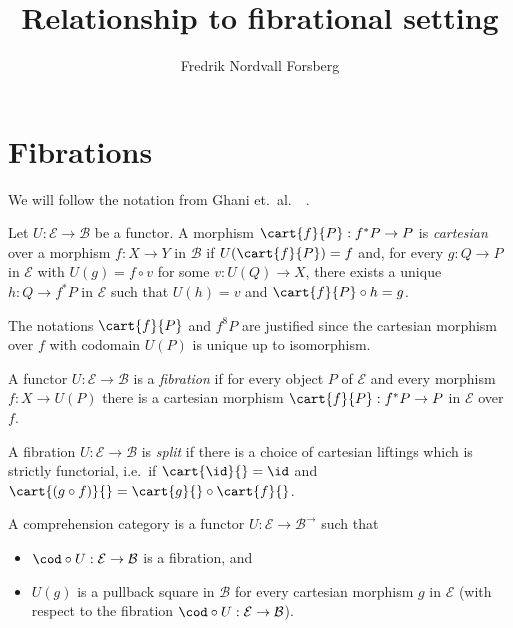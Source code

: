 \documentclass{article}
\title{Relationship to fibrational setting}
\author{Fredrik Nordvall Forsberg}
\begin{document}
\maketitle

\section{Fibrations}

We will follow the notation from Ghani et.\
al.\ ~\cite{ghaniJohannFumex2010fibind,ghaniJohannFumex2011indexedInd}.

\begin{definition}
  Let $U : \mathcal{E} \to \mathcal{B}$ be a functor. A morphism
  $\cart{f}{P} : f^* P \to P$ is \emph{cartesian} over a morphism $f :
  X \to Y$ in $\mathcal{B}$ if $U(\cart{f}{P}) = f$ and, for every $g
  : Q \to P$ in $\mathcal{E}$ with $U(g) = f \circ v$ for some $v :
  U(Q) \to X$, there exists a unique $h : Q \to f^* P$ in $\mathcal{E}$
  such that $U(h) = v$ and $\cart{f}{P} \circ h = g$.
\end{definition}

The notations $\cart{f}{P}$ and $f^8 P$ are justified since the cartesian morphism
over $f$ with codomain $U(P)$ is unique up to isomorphism.

\begin{definition}[Fibration]
  A functor $U : \mathcal{E} \to \mathcal{B}$ is a \emph{fibration} if
  for every object $P$ of $\mathcal{E}$ and every morphism $f : X \to
  U(P)$ there is a cartesian morphism $\cart{f}{P} : f^* P \to P$ in
  $\mathcal{E}$ over $f$.
\end{definition}

A fibration $U : \mathcal{E} \to \mathcal{B}$ is \emph{split} if there
is a choice of cartesian liftings which is strictly functorial, i.e.\
if $\cart{\id}{} = \id$ and $\cart{(g \circ f)}{} = \cart{g}{} \circ
\cart{f}{}$.

\begin{definition}
  A comprehension category is a functor $U : \mathcal{E} \to
  \mathcal{B}^{\rightarrow}$ such that
  \begin{itemize}
  \item $\cod \circ U : \mathcal{E} \to \mathcal{B}$ is a fibration, and
  \item $U(g)$ is a pullback square in $\mathcal{B}$ for every
    cartesian morphism $g$ in $\mathcal{E}$ (with respect to the
    fibration $\cod \circ U : \mathcal{E} \to \mathcal{B}$).
  \end{itemize}
\end{definition}
\end{document}

